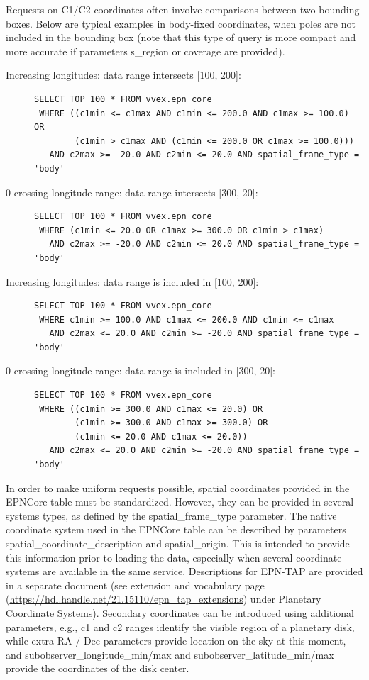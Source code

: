\documentclass[11pt,a4paper]{ivoa}
\begin{document}
Requests on C1/C2 coordinates often involve comparisons between two
bounding boxes. Below are typical examples in body-fixed coordinates,
when poles are not included in the bounding box (note that this type of query
is more compact and more accurate if parameters s\_region or coverage are provided).
\begin{description}
\item[Increasing longitudes: data range intersects {[100, 200]}:]\mbox{}
\begin{verbatim}
SELECT TOP 100 * FROM vvex.epn_core
 WHERE ((c1min <= c1max AND c1min <= 200.0 AND c1max >= 100.0) OR
        (c1min > c1max AND (c1min <= 200.0 OR c1max >= 100.0)))
   AND c2max >= -20.0 AND c2min <= 20.0 AND spatial_frame_type = 'body'
\end{verbatim}

\item[0-crossing longitude range: data range intersects {[300, 20]}:]\mbox{}
\begin{verbatim}
SELECT TOP 100 * FROM vvex.epn_core
 WHERE (c1min <= 20.0 OR c1max >= 300.0 OR c1min > c1max)
   AND c2max >= -20.0 AND c2min <= 20.0 AND spatial_frame_type = 'body'
\end{verbatim}

\item[Increasing longitudes: data range is included in {[100, 200]}:]\mbox{}
\begin{verbatim}
SELECT TOP 100 * FROM vvex.epn_core
 WHERE c1min >= 100.0 AND c1max <= 200.0 AND c1min <= c1max
   AND c2max <= 20.0 AND c2min >= -20.0 AND spatial_frame_type = 'body'
\end{verbatim}

\item[0-crossing longitude range: data range is included in {[300, 20]}:]\mbox{}
\begin{verbatim}
SELECT TOP 100 * FROM vvex.epn_core
 WHERE ((c1min >= 300.0 AND c1max <= 20.0) OR
        (c1min >= 300.0 AND c1max >= 300.0) OR
        (c1min <= 20.0 AND c1max <= 20.0))
   AND c2max <= 20.0 AND c2min >= -20.0 AND spatial_frame_type = 'body'
\end{verbatim}
\end{description}

In order to make uniform requests possible, spatial coordinates provided
in the EPNCore table must be standardized. However, they can be provided
in several systems types, as defined by the spatial\_frame\_type
parameter. The native coordinate system used in the EPNCore table can
be described by parameters spatial\_coordinate\_description and
spatial\_origin. This is intended to provide this information
prior to loading the data, especially when several coordinate
systems are available in the same service. Descriptions for EPN-TAP
are provided in a separate document (see extension and vocabulary
page (\url{https://hdl.handle.net/21.15110/epn_tap_extensions}) under Planetary Coordinate
Systems).
Secondary coordinates can be introduced using additional parameters,
e.g., c1 and c2 ranges identify the visible region of a planetary
disk, while extra RA / Dec parameters provide location on the
sky at this moment, and subobserver\_longitude\_min/max and
subobserver\_latitude\_min/max provide the coordinates of the disk center.
\end{document}
